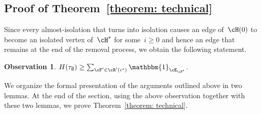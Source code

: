 \documentclass[11pt]{amsart}
\newcommand{\ind}{\mathbbm{1}}
\newtheorem{observation}[algocf]{Observation}
\theoremstyle{definition}
\numberwithin{equation}{section}
\begin{document}
	\subsection{Proof of Theorem~\ref{theorem: technical}}\label{subsection: isolation proof}
	Since every almost-isolation that turns into isolation causes an edge of~$\cH(0)$ to become an isolated vertex of~$\cH^*$ for some~$i\geq 0$ and hence an edge that remains at the end of the removal process, we obtain the following statement.
	\begin{observation}\label{observation: remain configuration effect}
		$H(\tau_\emptyset)\geq  \sum_{\cF'\in\cR'(i^\star)} \ind_{\cE_{\cF'}}$.
	\end{observation}
	
	We organize the formal presentation of the arguments outlined above in two lemmas.
	At the end of the section, using the above observation together with these two lemmas, we prove Theorem~\ref{theorem: technical}. 
	
\end{document}
